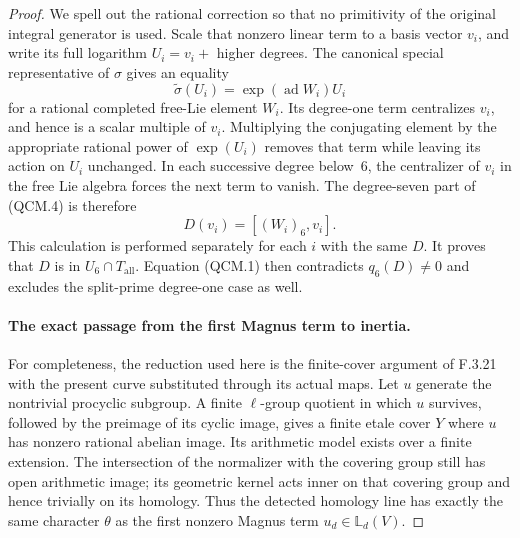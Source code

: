 \begin{proof}
We spell out the rational correction so that no
primitivity of the original integral generator is
used. Scale that nonzero linear term to a basis
vector $v_i$, and write its full logarithm
$U_i=v_i+$ higher degrees. The canonical special
representative of $\sigma$ gives an equality
\[
             \widetilde\sigma(U_i)=\exp(\operatorname{ad}W_i)U_i
                                                               \tag{QCM.4}
\]
for a rational completed free-Lie element $W_i$.
Its degree-one term centralizes $v_i$, and hence
is a scalar multiple of $v_i$. Multiplying the
conjugating element by the appropriate rational
power of $\exp(U_i)$ removes that term while
leaving its action on $U_i$ unchanged. In each
successive degree below~6, the centralizer of
$v_i$ in the free Lie algebra forces the next
term to vanish. The degree-seven part of
(QCM.4) is therefore
\[
                         D(v_i)=[(W_i)_6,v_i].              \tag{QCM.5}
\]
This calculation is performed separately for each
$i$ with the same $D$. It proves that $D$ is
in $U_6\cap T_{\mathrm{all}}$. Equation (QCM.1)
then contradicts $q_6(D)\ne0$ and excludes the
split-prime degree-one case as well.

\paragraph{The exact passage from the first Magnus term to inertia.}
For completeness, the reduction used here is the
finite-cover argument of F.3.21 with the present
curve substituted through its actual maps. Let
$u$ generate the nontrivial procyclic subgroup.
A finite $\ell$-group quotient in which $u$ survives,
followed by the preimage of its cyclic image,
gives a finite etale cover $Y$ where $u$ has
nonzero rational abelian image. Its arithmetic
model exists over a finite extension. The
intersection of the normalizer with the covering
group still has open arithmetic image; its
geometric kernel acts inner on that covering
group and hence trivially on its homology.
Thus the detected homology line has exactly the
same character $\theta$ as the first nonzero
Magnus term $u_d\in\mathbb L_d(V)$.


\end{proof}

